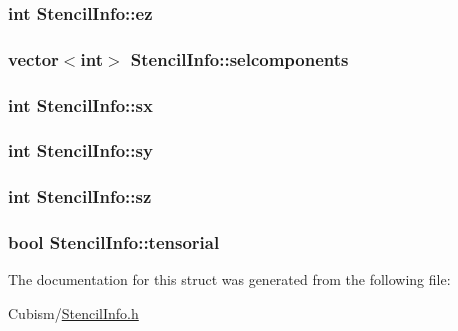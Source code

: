 \subsubsection[{ez}]{\setlength{\rightskip}{0pt plus 5cm}int Stencil\+Info\+::ez}\label{struct_stencil_info_afbdda2df54c6af8e9e8b8536e6e31bdc}
\hypertarget{struct_stencil_info_a6a07ebcb676dabaadf000e1348b8c016}{}
\subsubsection[{selcomponents}]{\setlength{\rightskip}{0pt plus 5cm}vector$<$int$>$ Stencil\+Info\+::selcomponents}\label{struct_stencil_info_a6a07ebcb676dabaadf000e1348b8c016}
\hypertarget{struct_stencil_info_acbfb2d23b2b10177dd846173a299b847}{}
\subsubsection[{sx}]{\setlength{\rightskip}{0pt plus 5cm}int Stencil\+Info\+::sx}\label{struct_stencil_info_acbfb2d23b2b10177dd846173a299b847}
\hypertarget{struct_stencil_info_a4f024cdf41fca32720321fa95bd2a8bd}{}
\subsubsection[{sy}]{\setlength{\rightskip}{0pt plus 5cm}int Stencil\+Info\+::sy}\label{struct_stencil_info_a4f024cdf41fca32720321fa95bd2a8bd}
\hypertarget{struct_stencil_info_a00e8cbf611bbb74ad861a6d74b6d0d9f}{}
\subsubsection[{sz}]{\setlength{\rightskip}{0pt plus 5cm}int Stencil\+Info\+::sz}\label{struct_stencil_info_a00e8cbf611bbb74ad861a6d74b6d0d9f}
\hypertarget{struct_stencil_info_ab3fce74853afec119eee90a6274d1559}{}
\subsubsection[{tensorial}]{\setlength{\rightskip}{0pt plus 5cm}bool Stencil\+Info\+::tensorial}\label{struct_stencil_info_ab3fce74853afec119eee90a6274d1559}


The documentation for this struct was generated from the following file\+:\begin{DoxyCompactItemize}
\item 
Cubism/\hyperlink{_stencil_info_8h}{Stencil\+Info.\+h}\end{DoxyCompactItemize}
